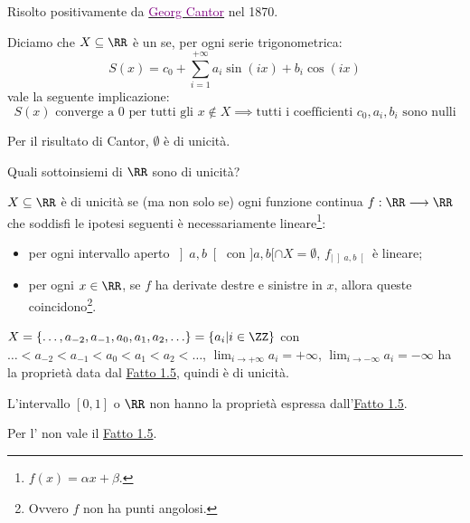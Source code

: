 \documentclass[11pt]{scrartcl}
\begin{document}
Risolto positivamente da \href{https://it.wikipedia.org/wiki/Georg_Cantor}{\textcolor{purple}{Georg Cantor}} nel 1870.

\begin{definition}
Diciamo che $X \subseteq \RR$ è un  se, per ogni serie trigonometrica:
\[ S(x) = c_0 + \sum_{i=1}^{+\infty}a_i\sin{(ix)}+b_i\cos{(ix)}
	\]
vale la seguente implicazione:
\[ \text{$S(x)$ converge a 0 per tutti gli $x\not\in X$} \implies \text{tutti i coefficienti $c_0,a_i,b_i$ sono nulli}
	\]
\end{definition}

\begin{example}
	Per il risultato di Cantor, $\emptyset$ è di unicità.
\end{example}

\begin{problem}
	Quali sottoinsiemi di $\RR$ sono di unicità?
\end{problem}

\begin{fact}
\label{unicità}
$X \subseteq \RR$ è di unicità se (ma non solo se) ogni funzione continua $f : \RR \longrightarrow \RR$ che soddisfi le ipotesi seguenti è necessariamente lineare\footnote{$f(x) = \alpha x + \beta$.}:
\begin{itemize}
	\item per ogni intervallo aperto $\left]a,b\right[$ con $]a,b[ \cap X = \emptyset$, $f_{|\left]a,b\right[}$ è lineare;
	\item per ogni $x \in \RR$, se $f$ ha derivate destre e sinistre in $x$, allora queste coincidono\footnote{Ovvero $f$ non ha punti angolosi.}.
\end{itemize}
\end{fact}

\begin{example}
	$X = \{\ldots,a_{-2},a_{-1},a_0,a_1,a_2,\ldots\} = \{a_i | i \in \ZZ\}$ con $\ldots < a_{-2} < a_{-1} < a_0 < a_1 < a_2 <\ldots$, $\displaystyle\lim_{i \to +\infty} a_i = +\infty$, $\displaystyle\lim_{i \to -\infty} a_i = -\infty$ ha la 
	proprietà data dal \hyperref[unicità]{Fatto 1.5}, quindi è di unicità.
\end{example}

\begin{notexample}
L'intervallo $[0,1]$ o $\RR$ non hanno la proprietà espressa dall'\hyperref[unicità]{Fatto 1.5}.
\end{notexample}

\begin{notexampleb}
Per l' non vale il \hyperref[unicità]{Fatto 1.5}.
\end{notexampleb}
\end{document}
